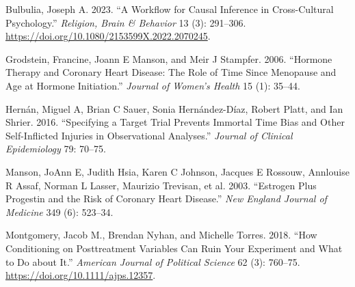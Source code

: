 \documentclass[
  ignorenonframetext,
  aspectratio=169,
  xcolor=\{dvipsnames\}]{beamer}
\newlength{\cslhangindent}
\newenvironment{CSLReferences}[2] %
 {\begin{list}{}{%
  \setlength{\itemindent}{0pt}
  \setlength{\leftmargin}{0pt}
  \setlength{\parsep}{0pt}
  \ifodd #1
   \setlength{\leftmargin}{\cslhangindent}
   \setlength{\itemindent}{-1\cslhangindent}
  \fi
  \setlength{\itemsep}{#2\baselineskip}}}
 {\end{list}}
\begin{document}
\begin{frame}{}
\label{section-1}
\label{refs}
\begin{CSLReferences}{1}{0}
Bulbulia, Joseph A. 2023. {``A Workflow for Causal Inference in
Cross-Cultural Psychology.''} \emph{Religion, Brain \& Behavior} 13 (3):
291--306. \url{https://doi.org/10.1080/2153599X.2022.2070245}.

Grodstein, Francine, Joann E Manson, and Meir J Stampfer. 2006.
{``Hormone Therapy and Coronary Heart Disease: The Role of Time Since
Menopause and Age at Hormone Initiation.''} \emph{Journal of Women's
Health} 15 (1): 35--44.

Hernán, Miguel A, Brian C Sauer, Sonia Hernández-Díaz, Robert Platt, and
Ian Shrier. 2016. {``Specifying a Target Trial Prevents Immortal Time
Bias and Other Self-Inflicted Injuries in Observational Analyses.''}
\emph{Journal of Clinical Epidemiology} 79: 70--75.

Manson, JoAnn E, Judith Hsia, Karen C Johnson, Jacques E Rossouw,
Annlouise R Assaf, Norman L Lasser, Maurizio Trevisan, et al. 2003.
{``Estrogen Plus Progestin and the Risk of Coronary Heart Disease.''}
\emph{New England Journal of Medicine} 349 (6): 523--34.

Montgomery, Jacob M., Brendan Nyhan, and Michelle Torres. 2018. {``How
Conditioning on Posttreatment Variables Can Ruin Your Experiment and
What to Do about It.''} \emph{American Journal of Political Science} 62
(3): 760--75. \url{https://doi.org/10.1111/ajps.12357}.

\end{CSLReferences}
\end{frame}
\end{document}
